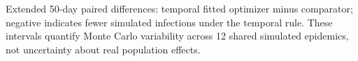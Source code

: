 \begin{table}[htbp]\centering\small

\caption{Extended 50-day paired differences: temporal fitted optimizer minus comparator; negative indicates fewer simulated infections under the temporal rule. These intervals quantify Monte Carlo variability across 12 shared simulated epidemics, not uncertainty about real population effects.}
\end{table}
